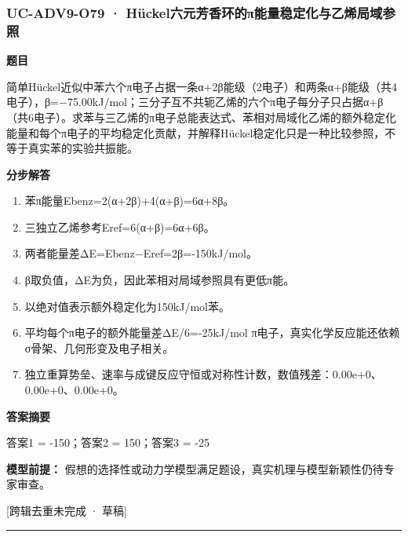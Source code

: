 \documentclass[UTF8,11pt,a4paper]{ctexart}
\begin{document}
\subsubsection*{UC-ADV9-O79 · Hückel六元芳香环的π能量稳定化与乙烯局域参照}
\noindent\textbf{题目}\par
简单Hückel近似中苯六个π电子占据一条α+2β能级（2电子）和两条α+β能级（共4电子），β=−75.00kJ/mol；三分子互不共轭乙烯的六个π电子每分子只占据α+β（共6电子）。求苯与三乙烯的π电子总能表达式、苯相对局域化乙烯的额外稳定化能量和每个π电子的平均稳定化贡献，并解释Hückel稳定化只是一种比较参照，不等于真实苯的实验共振能。\par
\medskip\noindent\textbf{分步解答}
\begin{enumerate}
\item 苯π能量Ebenz=2(α+2β)+4(α+β)=6α+8β。
\item 三独立乙烯参考Eref=6(α+β)=6α+6β。
\item 两者能量差ΔE=Ebenz−Eref=2β=-150kJ/mol。
\item β取负值，ΔE为负，因此苯相对局域参照具有更低π能。
\item 以绝对值表示额外稳定化为150kJ/mol苯。
\item 平均每个π电子的额外能量差ΔE/6=-25kJ/mol π电子，真实化学反应能还依赖σ骨架、几何形变及电子相关。
\item 独立重算势垒、速率与成键反应守恒或对称性计数，数值残差：0.00e+0、0.00e+0、0.00e+0。
\end{enumerate}
\noindent\textbf{答案摘要}\par
答案1 = -150；答案2 = 150；答案3 = -25\par
\noindent\textbf{模型前提：}
假想的选择性或动力学模型满足题设，真实机理与模型新颖性仍待专家审查。\par
\noindent\textcolor{red!65!black}{[跨辑去重未完成 · 草稿]} \par
\medskip\hrule\medskip
{}
\end{document}
